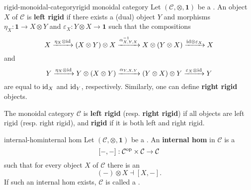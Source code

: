 \begin{topic}{rigid-monoidal-category}{rigid monoidal category}
    Let $(\mathcal{C}, \otimes, \textbf{1})$ be a . An object $X$ of $\mathcal{C}$ is \textbf{left rigid} if there exists a (dual) object $Y$ and morphisms $\eta_X : \textbf{1} \to X \otimes Y$ and $\varepsilon_X : Y \otimes X \to \textbf{1}$ such that the compositions
    \[ X \xrightarrow{\eta_X \otimes \text{id}} (X \otimes Y) \otimes X \xrightarrow{\alpha_{X, Y, X}^{-1}} X \otimes (Y \otimes X) \xrightarrow{\text{id} \otimes \varepsilon_X} X \]
    and
    \[ Y \xrightarrow{\eta_X \otimes \text{id}} Y \otimes (X \otimes Y) \xrightarrow{\alpha_{Y, X, Y}} (Y \otimes X) \otimes Y \xrightarrow{\varepsilon_X \otimes \text{id}} Y \]
    are equal to $\text{id}_X$ and $\text{id}_Y$, respectively. Similarly, one can define \textbf{right rigid} objects.
    
    The monoidal category $\mathcal{C}$ is \textbf{left rigid} (resp. \textbf{right rigid}) if all objects are left rigid (resp. right rigid), and \textbf{rigid} if it is both left and right rigid.
\end{topic}

\begin{topic}{internal-hom}{internal hom}
    Let $(\mathcal{C}, \otimes, \textbf{1})$ be a  . An \textbf{internal hom} in $\mathcal{C}$ is a 
    \[ [-, -] : \mathcal{C}^\textup{op} \times \mathcal{C} \to \mathcal{C} \]
    such that for every object $X$ of $\mathcal{C}$ there is an 
    \[ (-) \otimes X \dashv [X, -] . \]
    If such an internal hom exists, $\mathcal{C}$ is called a .
\end{topic}

